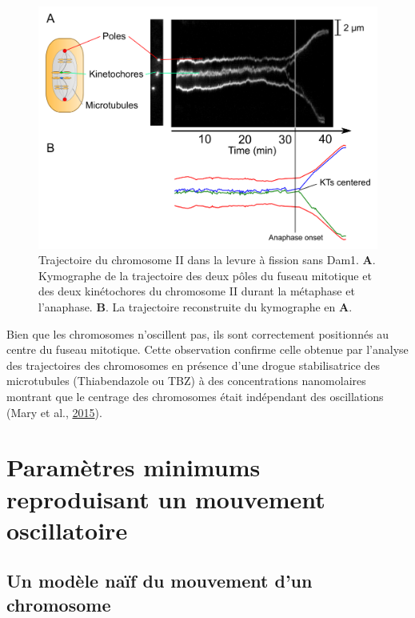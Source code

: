\documentclass[12pt,a4paper,twoside,openright]{book}
\begin{document}
\begin{figure}[htbp]
\centering
\includegraphics{figures/annexes/dam1-traj.png}
\caption[Trajectoire du chromosome II dans la levure à fission sans Dam1]{\label{fig:dam1-traj}Trajectoire
du chromosome II dans la levure à fission sans Dam1. \textbf{A}.
Kymographe de la trajectoire des deux pôles du fuseau mitotique et des
deux kinétochores du chromosome II durant la métaphase et l'anaphase.
\textbf{B}. La trajectoire reconstruite du kymographe en \textbf{A}.}
\end{figure}

Bien que les chromosomes n'oscillent pas, ils sont correctement
positionnés au centre du fuseau mitotique. Cette observation confirme
celle obtenue par l'analyse des trajectoires des chromosomes en présence
d'une drogue stabilisatrice des microtubules (Thiabendazole ou TBZ) à
des concentrations nanomolaires montrant que le centrage des chromosomes
était indépendant des oscillations (Mary et al.,
\protect\hyperlink{ref-Mary2015}{2015}).

\cleardoublepage
\clearpage\null

\section{Paramètres minimums reproduisant un mouvement
oscillatoire}\label{paramuxe8tres-minimums-reproduisant-un-mouvement-oscillatoire}

\label{sec:simu-oscillations}

\subsection{Un modèle naïf du mouvement d'un
chromosome}\label{un-moduxe8le-nauxeff-du-mouvement-dun-chromosome}
\end{document}
